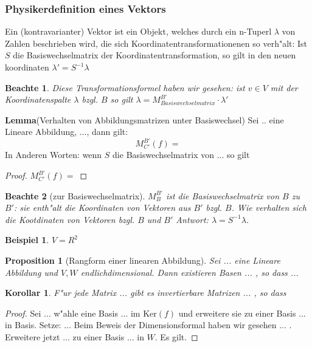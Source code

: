 \documentclass[11pt]{article}
\newtheorem{exa}{Beispiel}[section]
\newtheorem*{notte}{Beachte}
\newtheorem*{proposition}{Proposition}
\newtheorem*{korollar}{Korollar}
\begin{document}
\subsubsection{Physikerdefinition eines Vektors}
\label{sec:phyv}

Ein (kontravarianter) Vektor ist ein Objekt, welches durch ein n-Tuperl \(\lambda\)
von Zahlen beschrieben wird, die sich Koordinatentransformationenen so
verh"alt: Ist $S$ die Basiswechselmatrix der Koordinatentransformation, so gilt
in den neuen koordinaten $\lambda'=S^{-1}\lambda$

\begin{notte}
  Diese Transformationsformel haben wir gesehen: ist $v\in V$ mit der
  Koordinatenspalte $\lambda$ bzgl. $B$ so gilt
  $\lambda=M^{B'}_{Basiswechselmatrix}\cdot \lambda ' $
\end{notte}

\textbf{Lemma}(Verhalten von Abbildungsmatrizen unter Basiswechsel)
Sei .. eine Lineare Abbildung, ..., dann gilt:
\[
  M^{B'}_{C'}(f)=
\] In Anderen Worten: wenn $S$ die Basiswechselmatrix von ... so gilt

\begin{proof}
  $M^{B'}_{C'}(f)=$
\end{proof}

\begin{notte}[zur Basiswechselmatrix]
  $ M^{B'}_{B}$ ist die Basiswechselmatrix von $B$ zu $B'$: sie enth"alt die
  Koordinaten von Vektoren aus $B'$ bzgl. $B$. Wie verhalten sich die
  Kootdinaten von Vektoren bzgl. $B$ und $B'$ Antwort: $\lambda =
  S^{-1}\lambda$.
\end{notte}

\begin{exa}
  $V=R^{2}$
\end{exa}

\begin{proposition}[Rangform einer linearen Abbildung]
  Sei ... eine Lineare Abbildung und $V,W$ endlichdimensional. Dann existieren
  Basen ... , so dass ...
\end{proposition}

\begin{korollar}
  F"ur jede Matrix ... gibt es invertierbare Matrizen ... , so dass
\end{korollar}

\begin{proof}
  Sei ... w"ahle eine Basis ... im $\text{Ker}(f)$  und erweitere sie zu einer
  Basis ... in Basis. Setze: ... Beim Beweis der Dimensionsformal haben wir
  gesehen ... . Erweitere jetzt ... zu einer Basis ... in $W$. Es gilt. 
\end{proof}
\end{document}
